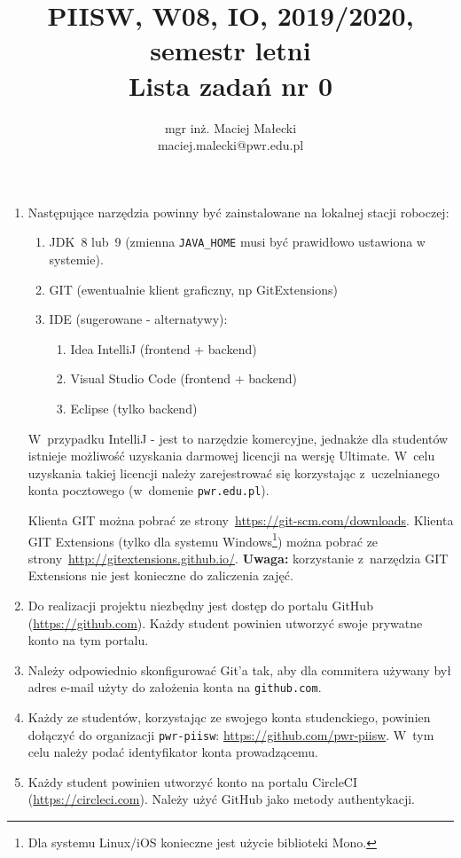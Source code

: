 \documentclass[12pt]{article}
\title{PIISW, W08, IO, 2019/2020, semestr letni\\Lista zadań nr 0}
\author{mgr inż. Maciej Małecki\\\small{maciej.malecki@pwr.edu.pl}}
\begin{document}
    \maketitle

    \begin{enumerate}
        \item Następujące narzędzia powinny być zainstalowane na lokalnej stacji roboczej:
            \begin{enumerate}
                \item JDK~8 lub~9 (zmienna \texttt{JAVA\_HOME} musi być prawidłowo ustawiona w systemie).
                \item GIT (ewentualnie klient graficzny, np GitExtensions)
                \item IDE (sugerowane - alternatywy):
                    \begin{enumerate}
                        \item Idea IntelliJ (frontend + backend)
                        \item Visual Studio Code (frontend + backend)
                        \item Eclipse (tylko backend)
                    \end{enumerate}
            \end{enumerate}
            
            W~przypadku IntelliJ - jest to narzędzie komercyjne, jednakże dla studentów istnieje możliwość uzyskania darmowej licencji na wersję Ultimate. W~celu uzyskania takiej licencji należy zarejestrować się korzystając z~uczelnianego konta pocztowego (w~domenie \texttt{pwr.edu.pl}).

            Klienta GIT można pobrać ze strony~\url{https://git-scm.com/downloads}. Klienta GIT Extensions (tylko dla systemu Windows\footnote{Dla systemu Linux/iOS konieczne jest użycie biblioteki Mono.}) można pobrać ze strony~\url{http://gitextensions.github.io/}. \textbf{Uwaga:} korzystanie z~narzędzia GIT Extensions nie jest konieczne do zaliczenia zajęć.

        \item Do realizacji projektu niezbędny jest dostęp do portalu GitHub (\url{https://github.com}). Każdy student powinien utworzyć swoje prywatne konto na tym portalu.

        \item Należy odpowiednio skonfigurować Git’a tak, aby dla commitera używany był adres e-mail użyty do założenia konta na \texttt{github.com}.

        \item Każdy ze studentów, korzystając ze swojego konta studenckiego, powinien dołączyć do organizacji \texttt{pwr-piisw}: \url{https://github.com/pwr-piisw}. W~tym celu należy podać identyfikator konta prowadzącemu.

        \item Każdy student powinien utworzyć konto na portalu CircleCI (\url{https://circleci.com}). Należy użyć GitHub jako metody authentykacji.
    \end{enumerate}
\end{document}
